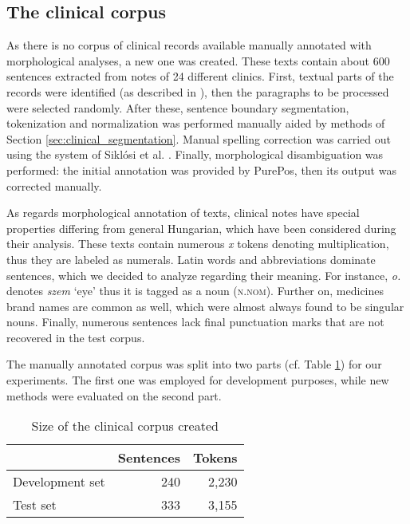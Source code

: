 \subsection{The clinical corpus}

As there is no corpus of clinical records available manually annotated with morphological analyses, a new one was created. 
These texts contain about 600 sentences extracted from notes of 24 different clinics. 
First, textual parts of the records were identified (as described in \cite{Siklosi2012}), then the paragraphs to be processed were selected randomly. 
After these, sentence boundary segmentation, tokenization and normalization was performed manually aided by methods of Section \ref{sec:clinical_segmentation}. 
Manual spelling correction was carried out using the system of Siklósi et al. \cite{Siklosi2013}. 
Finally, morphological disambiguation was performed: the initial annotation was provided by PurePos, then its output was corrected manually. 

As regards morphological annotation of texts, clinical notes have special properties differing from general Hungarian, which have been considered during their analysis. 
These texts contain numerous \textit{x} tokens denoting multiplication, thus they are labeled as numerals. 
Latin words and abbreviations dominate sentences, which we decided to analyze regarding their meaning. 
For instance, \textit{o.} denotes \textit{szem} `eye’ thus it is tagged as a noun (\textsc{n.nom}). 
Further on, medicines brand names are common as well, which were almost always found to be singular nouns. 
Finally, numerous sentences lack final punctuation marks that are not recovered in the test corpus. 

The manually annotated corpus was split into two parts (cf. Table \ref{tab:clin_corpus}) for our experiments. 
The first one was employed for development purposes, while new methods were evaluated on the second part.
%

\begin{table}[H]
\centering
\caption{Size of the clinical corpus created}
\label{tab:clin_corpus}
\begin{tabular}{ l  r  r } 
\hline
& Sentences & Tokens \\
\hline
Development set & 240 & 2,230 \\
Test set & 333 & 3,155 \\
\hline
\end{tabular}
\end{table}


